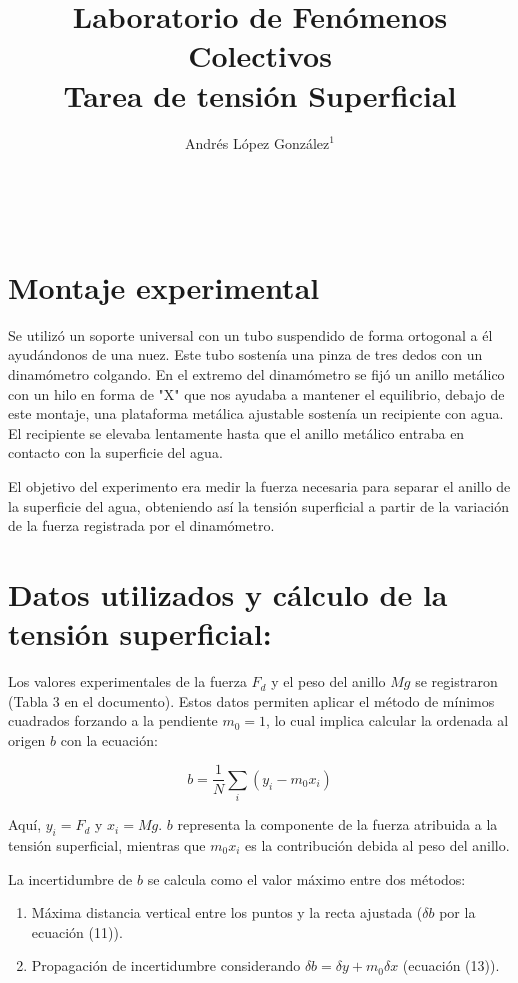 \documentclass[article,12pt]{elsarticle}
\begin{document}
\begin{frontmatter}
    \title{Laboratorio de Fenómenos Colectivos \\  Tarea de tensión Superficial} \\
    \author{Andrés López González$^1$} %
    \address{$^1$ Facultad de Ciencias, Universidad Nacional Autónoma de México, M\'exico CDMX.}
\end{frontmatter}

\section{Montaje experimental}

Se utilizó un soporte universal con un tubo suspendido de forma ortogonal a él ayudándonos de una nuez. Este tubo sostenía una pinza de tres dedos con un dinamómetro colgando. En el extremo del dinamómetro se fijó un anillo metálico con un hilo en forma de "X" que nos ayudaba a mantener el equilibrio, debajo de este montaje, una plataforma metálica ajustable sostenía un recipiente con agua. El recipiente se elevaba lentamente hasta que el anillo metálico entraba en contacto con la superficie del agua.

El objetivo del experimento era medir la fuerza necesaria para separar el anillo de la superficie del agua, obteniendo así la tensión superficial a partir de la variación de la fuerza registrada por el dinamómetro.


\section{Datos utilizados y cálculo de la tensión superficial:}
Los valores experimentales de la fuerza \( F_d \) y el peso del anillo \( Mg \) se registraron (Tabla 3 en el documento). Estos datos permiten aplicar el método de mínimos cuadrados forzando a la pendiente \( m_0 = 1 \), lo cual implica calcular la ordenada al origen \( b \) con la ecuación:

\[
b = \frac{1}{N} \sum_{i} (y_i - m_0 x_i)
\]

Aquí, \( y_i = F_d \) y \( x_i = Mg \). \( b \) representa la componente de la fuerza atribuida a la tensión superficial, mientras que \( m_0 x_i \) es la contribución debida al peso del anillo.

La incertidumbre de \( b \) se calcula como el valor máximo entre dos métodos:  
\begin{enumerate}
\item Máxima distancia vertical entre los puntos y la recta ajustada (\( \delta b \) por la ecuación (11)).
\item Propagación de incertidumbre considerando \( \delta b = \delta y + m_0 \delta x \) (ecuación (13)).
\end{enumerate}
\end{document}
